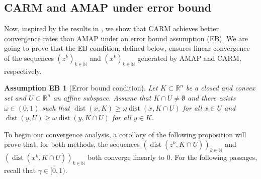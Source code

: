 \documentclass[smallextended,numbook,nospthms]{svjour3}
\theoremstyle{plain}
\newtheorem*{assumption}{Assumption EB}
\theoremstyle{definition}
\def\RR{\mathds R}
\def\NN{\mathds N}
\DeclareMathOperator{\dist}{dist}
\begin{document}
\subsection{CARM and AMAP under error bound}\label{subsec:comp EB}
Now, inspired by the results in \cite{Arefidamghani:2020}, we show that CARM achieves better convergence rates than AMAP under an error bound assumption (EB). We are going to prove that the EB condition, defined below, ensures linear convergence of the sequences $\left(z^{k}\right)_{k \in \NN}$ and $\left(x^{k}\right)_{k \in \NN}$ generated by AMAP and CARM, respectively.

\begin{assumption}[Error bound condition]\label{eb}
Let $K \subset \RR^{n}$ be a closed and convex set  and $U \subset \RR^{n}$ an affine subspace. Assume that $K \cap U \neq \emptyset$ and there exists $\omega \in(0,1)$ such that $\dist(x, K) \geq \omega \dist\left(x, K \cap U\right)$ for all $x \in U$ and $\dist(y, U) \geq \omega \dist\left(y, K \cap U\right)$ for all $y \in K$.
\end{assumption}

To begin our convergence analysis, a corollary of the following proposition will prove that, for both methods, the sequences $\left(\dist\left(z^{k}, K \cap U\right)\right)_{k \in \NN}$ and $\left(\dist\left(x^{k}, K \cap U\right)\right)_{k \in \NN}$ both converge linearly to $0$. For the following passages, recall that $\gamma \in [0,1)$.
\end{document}
